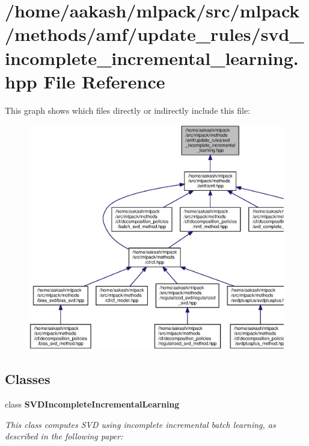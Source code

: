 \section{/home/aakash/mlpack/src/mlpack/methods/amf/update\+\_\+rules/svd\+\_\+incomplete\+\_\+incremental\+\_\+learning.hpp File Reference}
\label{svd__incomplete__incremental__learning_8hpp}
This graph shows which files directly or indirectly include this file\+:
\nopagebreak
\begin{figure}[H]
\begin{center}
\leavevmode
\includegraphics[width=350pt]{svd__incomplete__incremental__learning_8hpp__dep__incl}
\end{center}
\end{figure}
\subsection*{Classes}
\begin{DoxyCompactItemize}
\item 
class \textbf{ S\+V\+D\+Incomplete\+Incremental\+Learning}
\begin{DoxyCompactList}\small\item\em This class computes S\+VD using incomplete incremental batch learning, as described in the following paper\+: \end{DoxyCompactList}\end{DoxyCompactItemize}

